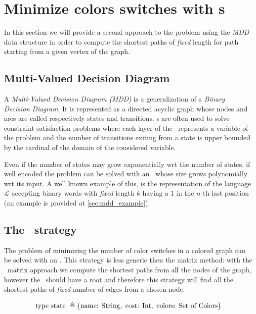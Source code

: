 \section{Minimize colors switches with \mdd s}

In this section we will provide a second approach to the problem using the \textit{MDD} data structure in order to compute the shortest paths of \textit{fixed} length for path starting from a given vertex of the graph.

\subsection{Multi-Valued Decision Diagram}

A \textit{Multi-Valued Decision Diagram (MDD)}\cite{regin} is a generalization of a \textit{Binary Decision Diagram}. It is represented as a directed acyclic graph whose nodes and arcs are called respectively states and transitions. \mdd s are often used to solve constraint satisfaction problems where each layer of the \mdd\ represents a variable of the problem and the number of transitions exiting from a state is upper bounded by the cardinal of the domain of the considered variable.

Even if the number of states may grow exponentially wrt the number of states, if well encoded the problem can be solved with an \mdd\ whose size grows polynomially wrt its input. A well known example of this, is the representation of the language $\mathcal{L}$ accepting binary words with \textit{fixed} length $k$ having a $1$ in the $n$-th last position (an example is provided at \cref{sec:mdd_example}).

\subsection{The \mdd\ strategy}
\label{sec:algo_mdd}
The problem of minimizing the number of color switches in a colored graph can be solved with an \mdd. This strategy is less generic then the matrix method: with the \FW\ matrix approach we compute the shortest paths from all the nodes of the graph, however the \mdd\ should have a root and therefore this strategy will find all the shortest paths of \textit{fixed} number of edges from a chosen node.

\begin{equation}
  \label{eq:record}
  \text{type state } \triangleq \{\text{name: } \text{String}, \text{ cost: } \text{Int}, \text{ colors: } \text{Set of Colors} \}
\end{equation}

